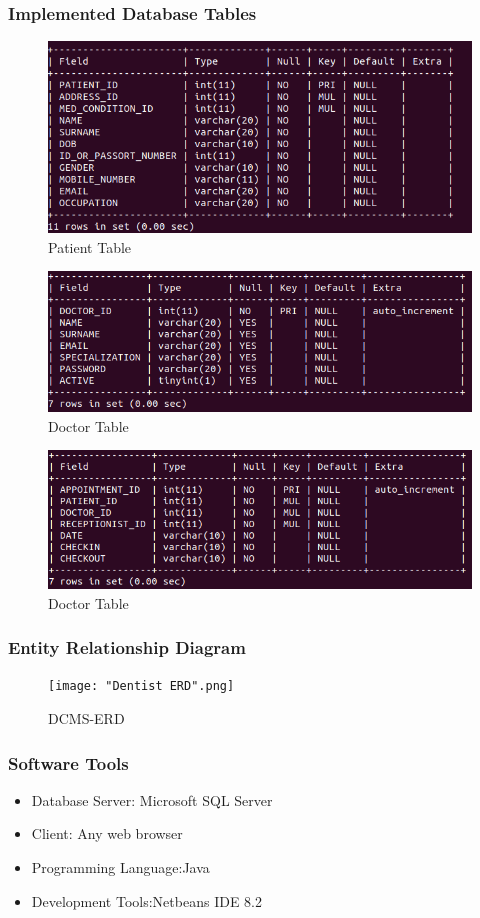 \documentclass[11 pt]{article}
\begin{document}
\subsubsection{Implemented Database Tables}
\begin{figure}[h]
\centering
\includegraphics[width=0.8\linewidth]{PATIENT_TABLE.png}
\caption{Patient Table}
\end{figure}
\begin{figure}[h]
\centering
\includegraphics[width=0.7\linewidth]{DOCTOR_TABLE.png}
\caption{Doctor Table}
\end{figure}
\begin{figure}[h]
\centering
\includegraphics[width=\linewidth]{APPOINTMENT_TABLE.png}
\caption{Doctor Table}
\end{figure}
\subsubsection{Entity Relationship Diagram}

\begin{figure}[h]
\centering
\texttt{[image: "Dentist ERD".png]}
\caption{DCMS-ERD}
\label{fig:ERD}
\end{figure}
\subsubsection{Software Tools}
\begin{itemize}
\item
Database Server: Microsoft SQL Server
\item
Client: Any web browser
\item
Programming Language:Java
\item
Development Tools:Netbeans IDE 8.2
\end{itemize}
\end{document}
